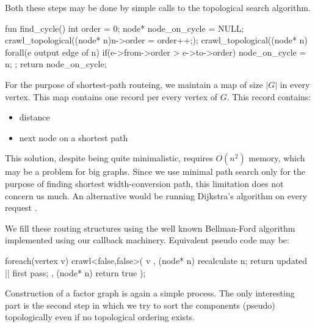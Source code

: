 Both these steps may be done by simple calls to the topological search algorithm.

\mybeginfig %
\begin{code}
fun find_cycle()
{
  int order = 0;
  node* node_on_cycle = NULL;
  crawl_topological((node* n){n->order = order++;});
  crawl_topological((node* n){
    forall(e output edge of n) 
      if(e->from->order > e->to->order)
        node_on_cycle = n;
  };
  return node_on_cycle;
}
\end{code}

For the purpose of shortest-path routeing, we maintain a map of size $| G |$ in every vertex. This map contains one record per every vertex of $G$. This record contains:

\begin{itemize}
  \item distance
  \item next node on a shortest path
\end{itemize}

This solution, despite being quite minimalistic, requires $O(n^2)$ memory, which may be a problem for big graphs. Since we use minimal path search only for the purpose of finding shortest width-conversion path, this limitation does not concern us much. An alternative would be running Dijkstra's algorithm on every request \cite{chapters}.

We fill these routing structures using the well known Bellman-Ford algorithm \cite{chapters} implemented using our callback machinery. Equivalent pseudo code may be:
\mybeginfig %
\begin{code}
foreach(vertex v)
{
  crawl<false,false>( v
    , (node* n){ recalculate n; return updated || first pass;}
    , (node* n){ return true }
  ); 
}
\end{code}

Construction of a factor graph is again a simple process. The only interesting part is the second step in which we try to sort the components (pseudo) topologically even if no topological ordering exists.

